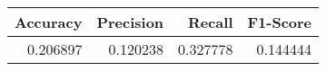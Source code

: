 \begin{tabular}{rrrr}
\toprule
 Accuracy &  Precision &   Recall &  F1-Score \\
\midrule
 0.206897 &   0.120238 & 0.327778 &  0.144444 \\
\bottomrule
\end{tabular}

